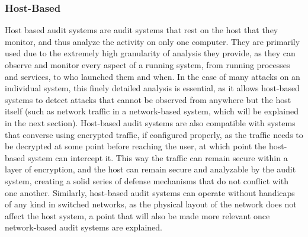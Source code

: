 \documentclass{acm_proc_article-sp}
\begin{document}
    	\subsubsection{Host-Based} %
    Host based audit systems are audit systems that rest on the host that they monitor, and thus analyze the activity on only one computer. They are primarily used due to the extremely high granularity of analysis they provide, as they can observe and monitor every aspect of a running system, from running processes and services, to who launched them and when. In the case of many attacks on an individual system, this finely detailed analysis is essential, as it allows host-based systems to detect attacks that cannot be observed from anywhere but the host itself (such as network traffic in a network-based system, which will be explained in the next section). Host-based audit systems are also compatible with systems that converse using encrypted traffic, if configured properly, as the traffic needs to be decrypted at some point before reaching the user, at which point the host-based system can intercept it. This way the traffic can remain secure within a layer of encryption, and the host can remain secure and analyzable by the audit system, creating a solid series of defense mechanisms that do not conflict with one another. Similarly, host-based audit systems can operate without handicaps of any kind in switched networks, as the physical layout of the network does not affect the host system, a point that will also be made more relevant once network-based audit systems are explained. 
    
\end{document}

